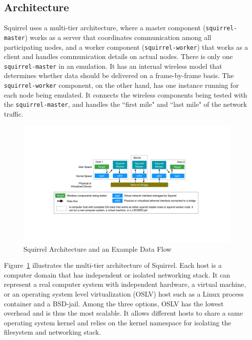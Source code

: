 \documentclass[12pt]{report}
\begin{document}
\subsection{Architecture}
Squirrel uses a multi-tier architecture, where a master component (\texttt{squirrel-master}) works as a server that coordinates communication among all participating nodes, and a worker component (\texttt{squirrel-worker}) that works as a client and handles communication details on actual nodes. There is only one \texttt{squirrel-master} in an emulation. It has an internal wireless model that determines whether data should be delivered on a frame-by-frame basis. The \texttt{squirrel-worker} component, on the other hand, has one instance running for each node being emulated. It connects the wireless components being tested with the \texttt{squirrel-master}, and handles the ``first mile" and ``last mile" of the network traffic.

\begin{figure}[h]
  \begin{center}
    \includegraphics[width=\textwidth]{figures/squirrelArch.pdf}
    \caption{\label{fig:squirrel_arch}Squirrel Architecture and an Example Data Flow}
  \end{center}
\end{figure}

Figure~\ref{fig:squirrel_arch} illustrates the multi-tier architecture of Squirrel. Each host is a computer domain that has independent or isolated networking stack. It can represent a real computer system with independent hardware, a virtual machine, or an operating system level virtualization (OSLV) host such as a Linux process container \cite{menage2007adding} and a BSD-jail. Among the three options, OSLV has the lowest overhead and is thus the most scalable. It allows different hosts to share a same operating system kernel and relies on the kernel namespace for isolating the filesystem and networking stack.
\end{document}
